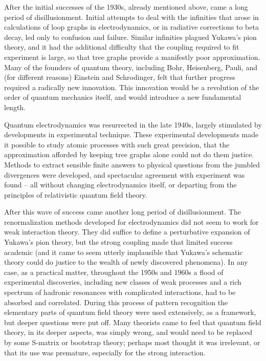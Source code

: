 \documentclass[aps,epsf]{revtex4}
\begin{document}
After the initial successes of the 1930s, already mentioned above,
came a long period of disillusionment.  Initial attempts to deal with
the infinities that arose in calculations of loop graphs in
electrodynamics, or in radiative corrections to beta decay, led only
to confusion and failure.  Similar infinities plagued Yukawa's pion
theory, and it had the additional difficulty that the coupling
required to fit experiment is large, so that tree graphs provide a
manifestly poor approximation.  Many of the founders of quantum
theory, including Bohr, Heisenberg, Pauli, and (for different reasons)
Einstein and Schrodinger, felt that further progress required a
radically new innovation.  This innovation would be a revolution of
the order of quantum mechanics itself, and would introduce a new
fundamental length.

Quantum electrodynamics was resurrected in the late 1940s, largely
stimulated by developments in experimental technique.  These
experimental developments made it possible to study atomic processes
with such great precision, that the approximation afforded by keeping
tree graphs alone could not do them justice.  Methods to extract
sensible finite answers to physical questions from the jumbled
divergences were developed, and spectacular agreement with experiment
was found -- all without changing electrodynamics itself, or departing
from the principles of relativistic quantum field theory.  

After this
wave of success came another long period of disillusionment.  The
renormalization methods developed for electrodynamics did not seem to
work for weak interaction theory.  They did suffice to define a
perturbative expansion of Yukawa's pion theory, but the strong
coupling made that limited success academic (and it came to seem
utterly implausible that Yukawa's schematic theory could do justice to
the wealth of newly discovered phenomena).  In any case, as a
practical matter, throughout the 1950s and 1960s a flood of
experimental discoveries, including new classes of weak processes and
a rich spectrum of hadronic resonances with complicated interactions,
had to be absorbed and correlated.  During this process of pattern
recognition the elementary parts of quantum field theory were used
extensively, as a framework, but deeper questions were put off.  Many
theorists came to feel that quantum field theory, in its deeper
aspects, was simply wrong, and would need to be replaced by some
S-matrix or bootstrap theory; perhaps most thought it was irrelevant,
or that its use was premature, especially for the strong interaction.
\end{document}
